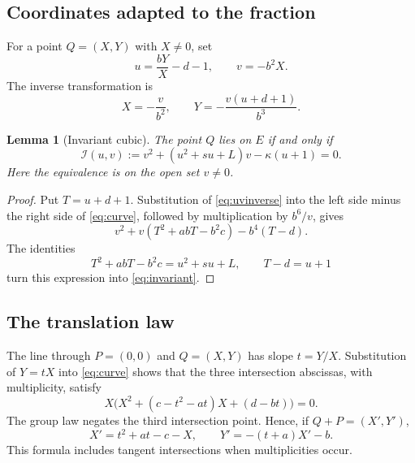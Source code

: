 \documentclass[11pt,letterpaper]{article}
\numberwithin{equation}{section}
\newtheorem{lemma}[theorem]{Lemma}
\theoremstyle{definition}
\theoremstyle{remark}
\newcommand{\inv}{\mathcal{I}}
\begin{document}
\subsection{Coordinates adapted to the fraction}
For a point $Q=(X,Y)$ with $X\ne0$, set
\begin{equation}\label{eq:uv}
 u=\frac{bY}{X}-d-1,\qquad v=-b^2X.
\end{equation}
The inverse transformation is
\begin{equation}\label{eq:uvinverse}
 X=-\frac{v}{b^2},\qquad
 Y=-\frac{v(u+d+1)}{b^3}.
\end{equation}

\begin{lemma}[Invariant cubic]\label{lem:invariant}
The point $Q$ lies on $E$ if and only if
\begin{equation}\label{eq:invariant}
 \inv(u,v):=v^2+(u^2+su+L)v-\kappa(u+1)=0.
\end{equation}
Here the equivalence is on the open set $v\ne0$.
\end{lemma}
\begin{proof}
Put $T=u+d+1$. Substitution of \eqref{eq:uvinverse} into the left side
minus the right side of \eqref{eq:curve}, followed by multiplication by
$b^6/v$, gives
\[
 v^2+v(T^2+abT-b^2c)-b^4(T-d).
\]
The identities
\[
 T^2+abT-b^2c=u^2+su+L,\qquad T-d=u+1
\]
turn this expression into \eqref{eq:invariant}.
\end{proof}

\subsection{The translation law}
The line through $P=(0,0)$ and $Q=(X,Y)$ has slope $t=Y/X$.
Substitution of $Y=tX$ into \eqref{eq:curve} shows that the three
intersection abscissas, with multiplicity, satisfy
\[
 X\bigl(X^2+(c-t^2-at)X+(d-bt)\bigr)=0.
\]
The group law negates the third intersection point. Hence, if
$Q+P=(X',Y')$,
\begin{equation}\label{eq:elladdition}
 X'=t^2+at-c-X,\qquad Y'=-(t+a)X'-b.
\end{equation}
This formula includes tangent intersections when multiplicities occur.
\end{document}
